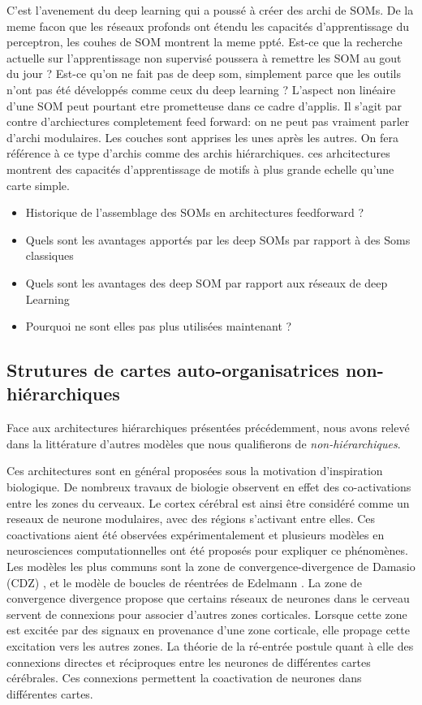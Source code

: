 \documentclass[../main]{subfiles}
\begin{document}
C'est l'avenement du deep learning qui a poussé à créer des archi de SOMs. De la meme facon que les réseaux profonds ont étendu les capacités d'apprentissage du perceptron, les couhes de SOM montrent la meme ppté.
Est-ce que la recherche actuelle sur l'apprentissage non supervisé poussera à remettre les SOM au gout du jour ? Est-ce qu'on ne fait pas de deep som, simplement parce que les outils n'ont pas été développés comme ceux du deep learning ? L'aspect non linéaire d'une SOM peut pourtant etre prometteuse dans ce cadre d'applis.
Il s'agit par contre d'archiectures completement feed forward: on ne peut pas vraiment parler d'archi modulaires. Les couches sont apprises les unes après les autres.
On fera référence à ce type d'archis comme des archis hiérarchiques.
ces arhcitectures montrent des capacités d'apprentissage de motifs à plus grande echelle qu'une carte simple.

\begin{itemize}
    \item Historique de l'assemblage des SOMs en architectures feedforward ? 
    \item Quels sont les avantages apportés par les deep SOMs par rapport à des Soms classiques
    \item Quels sont les avantages des deep SOM par rapport aux réseaux de deep Learning 
    \item Pourquoi ne sont elles pas plus utilisées maintenant ?
\end{itemize}

\subsection{Strutures de cartes auto-organisatrices non-hiérarchiques}

Face aux architectures hiérarchiques présentées précédemment, nous avons relevé dans la littérature d'autres modèles que nous qualifierons de \emph{non-hiérarchiques}. 


Ces architectures sont en général proposées sous la motivation d'inspiration biologique.
De nombreux travaux de biologie observent en effet des co-activations entre les zones du cerveaux. Le cortex cérébral est ainsi être considéré comme un reseaux de neurone modulaires, avec des régions s'activant entre elles. \cite{primate_cortex_91,mountcastle_columnar_1997,Harriger2012RichCO}
Ces coactivations aient été observées expérimentalement et plusieurs modèles en neurosciences computationnelles ont été proposés pour expliquer ce phénomènes. Les modèles les plus communs sont la zone de convergence-divergence de Damasio (CDZ) \cite{damasio_time-locked_1989}, et le modèle de boucles de réentrées de Edelmann \cite{Edelman1982GroupSA}.
La zone de convergence divergence propose que certains réseaux de neurones dans le cerveau servent de connexions pour associer d'autres zones corticales. Lorsque cette zone est excitée par des signaux en provenance d'une zone corticale, elle propage cette excitation vers les autres zones.
La théorie de la ré-entrée postule quant à elle des connexions directes et réciproques entre  les neurones de différentes cartes cérébrales. Ces connexions permettent la coactivation de neurones dans différentes cartes. 
\end{document}
